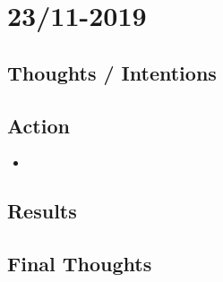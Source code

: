 \documentclass{article}
\begin{document}
\section{23/11-2019}
\subsection{Thoughts / Intentions}
\text  

\subsection{Action}
\begin{itemize}
    \item 
    
    \end{itemize}

\subsection{Results}
\text 

\subsection{Final Thoughts}
\text 
\end{document}
